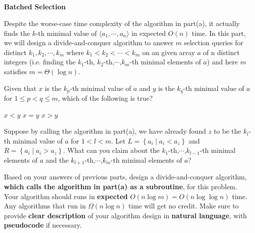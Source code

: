 \begin{parts}
\newpage

\part{} \textbf{Batched Selection} \par

Despite the worse-case time complexity of the algorithm in part(a), it actually finds the $k$-th minimal value of \(\langle a_1,\cdots,a_n\rangle\) in expected $O(n)$ time. In this part, we will design a divide-and-conquer algorithm to answer $m$ selection queries for distinct $k_1, k_2, \cdots, k_m$ where $k_1 < k_2 < \cdots < k_m$ on an given array $a$ of n distinct integers (i.e. finding the $k_1$-th, $k_2$-th,$\cdots$,$k_m$-th minimal elements of $a$) and here $m$ satisfies $m = \Theta(\log n)$.

\begin{subparts}
    \subpart[1] Given that $x$ is the $k_p$-th minimal value of $a$ and $y$ is the $k_q$-th minimal value of $a$ for $1 \leq p < q \leq m$, which of the following is true?
    
    \begin{oneparcheckboxes}
        \choice $x < y$
        \choice $x = y$
        \choice $x > y$
    \end{oneparcheckboxes}

    

    \subpart[2] Suppose by calling the algorithm in part(a), we have already found $z$ to be the $k_l$-th minimal value of $a$ for $1 < l < m$. Let $L = \left\{a_i \mid a_i < a_z\right\}$ and $R = \left\{a_i \mid a_i > a_z\right\}$. What can you claim about the $k_1$-th,$\cdots$,$k_{l-1}$-th minimal elements of $a$ and the $k_{l+1}$-th,$\cdots$,$k_{m}$-th minimal elements of $a$?
    
    \begin{solution}
    \vspace{1in}
    \end{solution}
    
    \subpart[6] Based on your answers of previous parts, design a divide-and-conquer algorithm, \textbf{which calls the algorithm in part(a) as a subroutine}, for this problem. Your algorithm should runs in \textbf{expected} $O(n \log m) = O(n \log \log n)$ time. Any algorithms that run in $\Omega(n \log n)$ time will get no credit. Make sure to provide \textbf{clear description} of your algorithm design in \textbf{natural language}, with \textbf{pseudocode} if necessary.
    

\end{subparts}
\end{parts}
